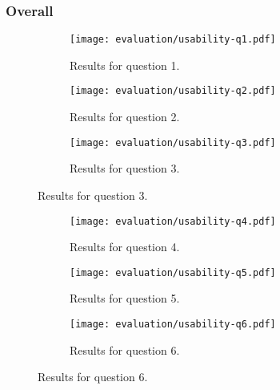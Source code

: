 \subsubsection{Overall}

\begin{figure}[H]
	\centering
	\begin{subfigure}{.8\textwidth}
  		\centering
  		\texttt{[image: evaluation/usability-q1.pdf]}
  		\caption{Results for question 1.}
	\end{subfigure}\par\bigskip
	
	\begin{subfigure}{.8\textwidth}
  		\centering
  		\texttt{[image: evaluation/usability-q2.pdf]}
  		\caption{Results for question 2.}
	\end{subfigure}\par\bigskip
	
	\begin{subfigure}{.8\textwidth}
  		\centering
  		\texttt{[image: evaluation/usability-q3.pdf]}
  		\caption{Results for question 3.}
	\end{subfigure}
\end{figure}

\begin{figure}[H]\ContinuedFloat
	\centering
	\begin{subfigure}{.8\textwidth}
  		\centering
  		\texttt{[image: evaluation/usability-q4.pdf]}
  		\caption{Results for question 4.}
	\end{subfigure}\par\bigskip
	
	\begin{subfigure}{.8\textwidth}
  		\centering
  		\texttt{[image: evaluation/usability-q5.pdf]}
  		\caption{Results for question 5.}
	\end{subfigure}\par\bigskip
	
	\begin{subfigure}{.8\textwidth}
  		\centering
  		\texttt{[image: evaluation/usability-q6.pdf]}
  		\caption{Results for question 6.}
	\end{subfigure}
\end{figure}

